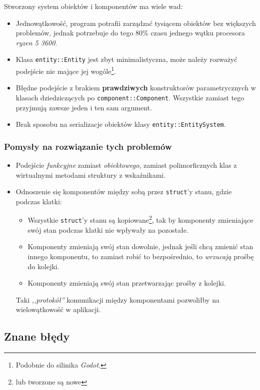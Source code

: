 \documentclass[a4paper,11pt]{article}
\begin{document}
Stworzony system obiektów i komponentów ma wiele wad:
\begin{itemize}
    \item Jednowątkowość, program potrafii zarządzać tysiącem obiektów bez
        większych problemów, jednak potrzebuje do tego 80\% czasu jednego wątku
        procesora \emph{ryzen 5 3600}.
    \item Klasa \texttt{entity::Entity} jest zbyt minimalistyczna, może należy
        rozważyć podejście nie mające jej wogóle\footnote{Podobnie do silinika
        \emph{Godot}.}.
    \item Błędne podejście z brakiem \textbf{prawdziwych} konstruktorów
        parametrycznych w klasach dziedziczących po
        \texttt{component::Component}. Wszystkie zamiast tego przyjmują zawsze
        jeden i ten sam argument.
    \item Brak sposobu na serializacje obiektów klasy \texttt{entity::EntitySystem}.
\end{itemize}

\subsubsection*{Pomysły na rozwiązanie tych problemów}

\begin{itemize}
    \item Podejście \emph{funkcyjne} zamiast \emph{obiektowego}, zamiast polimorficznych klas z wirtualnymi metodami struktury z wskaźnikami.
    \item Odnoszenie się komponentów między sobą przez \texttt{struct}'y stanu, gdzie podczas klatki: 
        \begin{itemize}
            \item Wszystkie \texttt{struct}'y stanu są kopiowane\footnote{lub tworzone są nowe}, tak by komponenty zmieniające swój stan podczas klatki nie wpływały na pozostałe.
            \item Komponenty zmieniają swój stan dowolnie, jednak jeśli chcą zmienić stan innego komponentu, to zamiast robić to bezpośrednio, to \emph{wrzucają} prośbę do kolejki.
            \item Komponenty zmieniają swój stan przetwarzając prośby z kolejki.
        \end{itemize}
        Taki \emph{,,protokół''} komunikacji między komponentami pozwoliłby na wielowątkowość w aplikacji.
\end{itemize}

\subsection{Znane błędy}
\end{document}

